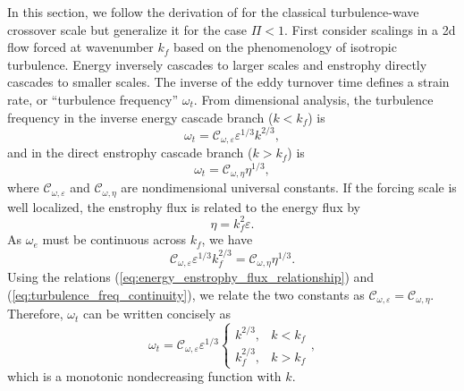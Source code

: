 \documentclass{ametsoc}
\begin{document}
In this section, we follow the derivation of \citet{Vallis1993} for
the classical turbulence-wave crossover scale but generalize it
for the case $\Pi<1$. First consider scalings in a 2d flow forced
at wavenumber $k_{f}$ based on the phenomenology of isotropic turbulence. 
Energy inversely cascades to larger scales and
enstrophy directly cascades to smaller scales. The inverse of the eddy
turnover time defines a strain rate, or ``turbulence frequency''
$\omega_{t}$. From dimensional analysis, the turbulence frequency in 
the inverse energy cascade branch ($k<k_f$) is
\begin{equation}
\omega_{t}=\mathcal{C}_{\omega,\varepsilon}\varepsilon^{1/3}k^{2/3},\label{eq:eddy_turnover_freq_inverse_cascade}
\end{equation}
and in the direct enstrophy cascade branch ($k>k_f$) is
\begin{equation}
\omega_{t}=\mathcal{C}_{\omega,\eta}\eta^{1/3},\label{eq:eddy_turnover_freq_direct_enstrophy_cascade}
\end{equation}
where $\mathcal{C}_{\omega,\varepsilon}$ and $\mathcal{C}_{\omega,\eta}$
are nondimensional universal constants. If the forcing scale is 
well localized, the enstrophy flux is related to the energy flux by
\begin{equation}
\eta=k_{f}^{2}\varepsilon.\label{eq:energy_enstrophy_flux_relationship}
\end{equation}
As $\omega_{e}$ must be continuous across $k_{f}$, we have
\begin{equation}
\mathcal{C}_{\omega,\varepsilon}\varepsilon^{1/3}k_{f}^{2/3}=\mathcal{C}_{\omega,\eta}\eta^{1/3}.\label{eq:turbulence_freq_continuity}
\end{equation}
Using the relations (\ref{eq:energy_enstrophy_flux_relationship}) and (\ref{eq:turbulence_freq_continuity}),
we relate the two constants as $\mathcal{C}_{\omega,\varepsilon}=\mathcal{C}_{\omega,\eta}$.
Therefore, $\omega_{t}$ can be written concisely as
\begin{equation}
\omega_{t}=\mathcal{C}_{\omega,\varepsilon}\varepsilon^{1/3}\begin{cases}
k^{2/3}, & k<k_{f}\\
k_{f}^{2/3}, & k>k_{f}
\end{cases},\label{eq:eddy_turnover_freq_general_form}
\end{equation}
which is a monotonic nondecreasing function with $k$.
\end{document}
